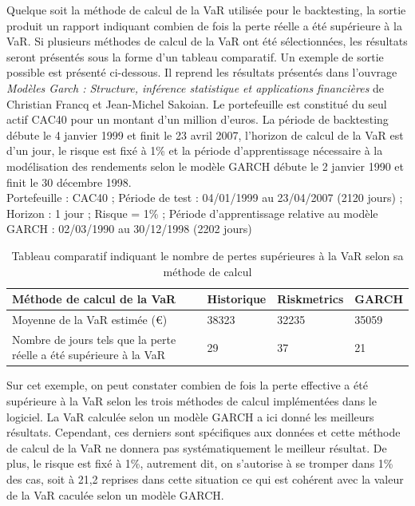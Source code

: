\documentclass[a4paper]{report}
\begin{document}
Quelque soit la méthode de calcul de la VaR utilisée pour le backtesting, la sortie produit un rapport indiquant combien de fois la perte réelle a été supérieure à la VaR.
Si plusieurs méthodes de calcul de la VaR ont été sélectionnées, les résultats seront présentés sous la forme d’un tableau comparatif.
Un exemple de sortie possible est présenté ci-dessous.
Il reprend les résultats présentés dans l'ouvrage \emph{Modèles Garch : Structure, inférence statistique et applications financières} de Christian Francq et Jean-Michel Sakoian.
Le portefeuille est constitué du seul actif CAC40 pour un montant d'un million d'euros.
La période de backtesting débute le 4 janvier 1999 et finit le 23 avril 2007, l’horizon de calcul de la VaR est d'un jour, le risque est fixé à 1\% et la période d'apprentissage nécessaire à la modélisation des rendements selon le modèle GARCH débute le 2 janvier 1990 et finit le 30 décembre 1998.\\


Portefeuille : CAC40 ; Période de test : 04/01/1999 au 23/04/2007 (2120 jours) ; Horizon : 1 jour ; Risque = 1\% ; Période d'apprentissage relative au modèle GARCH : 02/03/1990 au 30/12/1998 (2202 jours)

\begin{table}[H]
\begin{center}
    \begin{tabular}{ | p{3cm} | l | l | l | }
    \hline
    Méthode de calcul de la VaR & Historique & Riskmetrics & GARCH \\
    \hline
    Moyenne de la VaR estimée (\euro) & 38323 & 32235 & 35059 \\
    \hline
    Nombre de jours tels que la perte réelle a été supérieure à la VaR & 29 & 37 & 21\\
    \hline
    \end{tabular}
    \caption{Tableau comparatif indiquant le nombre de pertes supérieures à la VaR selon sa méthode de calcul}
\end{center}
\end{table}

Sur cet exemple, on peut constater combien de fois la perte effective a été supérieure à la VaR selon les trois méthodes de calcul implémentées dans le logiciel.
La VaR calculée selon un modèle GARCH a ici donné les meilleurs résultats.
Cependant, ces derniers sont spécifiques aux données et cette méthode de calcul de la VaR ne donnera pas systématiquement le meilleur résultat.
De plus, le risque est fixé à 1\%, autrement dit, on s'autorise à se tromper dans 1\% des cas, soit à 21,2 reprises dans cette situation ce qui est cohérent avec la valeur de la VaR caculée selon un modèle GARCH.
\end{document}
